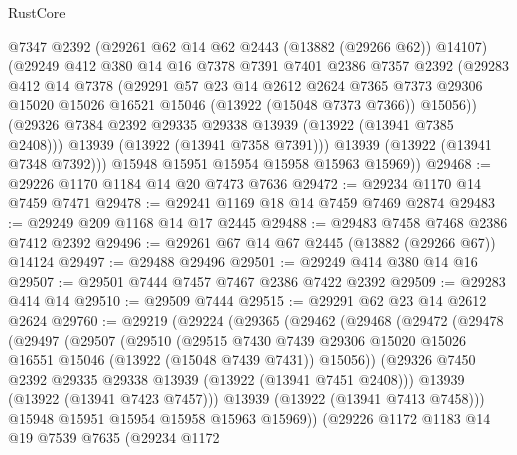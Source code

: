 \begin{lexlean}{RustCore}
\begin{coremodule}
          @7347
          @2392
          (@29261 @62 @14 @62 @2443 (@13882 (@29266 @62)) @14107)
          (@29249
            @412
            @380
            @14
            @16
            @7378
            @7391
            @7401
            @2386
            @7357
            @2392
            (@29283
              @412
              @14
              @7378
              (@29291
                @57
                @23
                @14
                @2612
                @2624
                @7365
                @7373
                @29306
                @15020
                @15026
                @16521
                @15046
                (@13922 (@15048 @7373 @7366))
                @15056))
            (@29326 @7384 @2392 @29335 @29338 @13939 (@13922 (@13941 @7385 @2408)))
            @13939
            (@13922 (@13941 @7358 @7391)))
          @13939
          (@13922 (@13941 @7348 @7392)))
        @15948
        @15951
        @15954
        @15958
        @15963
        @15969))
@29468 := @29226 @1170 @1184 @14 @20 @7473 @7636
@29472 := @29234 @1170 @14 @7459 @7471
@29478 := @29241 @1169 @18 @14 @7459 @7469 @2874
@29483 := @29249 @209 @1168 @14 @17 @2445
@29488 := @29483 @7458 @7468 @2386 @7412 @2392
@29496 := @29261 @67 @14 @67 @2445 (@13882 (@29266 @67)) @14124
@29497 := @29488 @29496
@29501 := @29249 @414 @380 @14 @16
@29507 := @29501 @7444 @7457 @7467 @2386 @7422 @2392
@29509 := @29283 @414 @14
@29510 := @29509 @7444
@29515 := @29291 @62 @23 @14 @2612 @2624
@29760 := @29219
    (@29224
      (@29365
        (@29462
          (@29468
            (@29472
              (@29478
                (@29497
                  (@29507
                    (@29510
                      (@29515
                        @7430
                        @7439
                        @29306
                        @15020
                        @15026
                        @16551
                        @15046
                        (@13922 (@15048 @7439 @7431))
                        @15056))
                    (@29326 @7450 @2392 @29335 @29338 @13939 (@13922 (@13941 @7451 @2408)))
                    @13939
                    (@13922 (@13941 @7423 @7457)))
                  @13939
                  (@13922 (@13941 @7413 @7458)))
                @15948
                @15951
                @15954
                @15958
                @15963
                @15969))
            (@29226
              @1172
              @1183
              @14
              @19
              @7539
              @7635
              (@29234
                @1172

\end{coremodule}
\end{lexlean}
